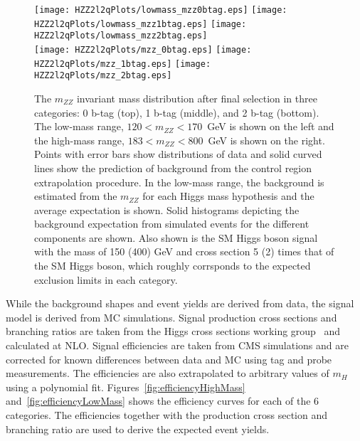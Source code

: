 \begin{figure}
\begin{center}
\texttt{[image: HZZ2l2qPlots/lowmass\_mzz0btag.eps]}
\texttt{[image: HZZ2l2qPlots/lowmass\_mzz1btag.eps]}
\texttt{[image: HZZ2l2qPlots/lowmass\_mzz2btag.eps]}\\
\texttt{[image: HZZ2l2qPlots/mzz\_0btag.eps]}
\texttt{[image: HZZ2l2qPlots/mzz\_1btag.eps]}
\texttt{[image: HZZ2l2qPlots/mzz\_2btag.eps]}
\caption{The $m_{ZZ}$ invariant mass distribution after final selection in
three categories: 0 b-tag (top), 1 b-tag (middle), and 2 b-tag (bottom). 
The low-mass range, $120<m_{ZZ}<170$~GeV is shown on the left and the
high-mass range, $183<m_{ZZ}<800$~GeV is shown on the right.  Points with
error bars show distributions of data and solid curved lines show the 
prediction of background from the control region extrapolation procedure.
In the low-mass range, the background is estimated from the $m_{ZZ}$ for
each Higgs mass hypothesis and the average expectation is shown.  Solid
histograms depicting the background expectation from simulated events
for the different components are shown.  Also shown is the SM Higgs boson
signal with the mass of 150 (400) GeV and cross section 5 (2) times that 
of the SM Higgs boson, which roughly corrsponds to the expected exclusion 
limits in each category.}
\label{fig:HZZ2l2qMassDistributions}
\end{center}
\end{figure}

While the background shapes and event yields are derived from data, the signal
model is derived from MC simulations.  Signal production cross sections
and branching ratios are taken from the Higgs cross sections working
group~\cite{??} and calculated at NLO.  Signal efficiencies are 
taken from CMS simulations and are
corrected for known differences between data and MC using tag and
probe measurements.  The efficiencies are also extrapolated to 
arbitrary values of $m_H$ using a polynomial fit.  Figures~\ref{fig:efficiencyHighMass}
and~\ref{fig:efficiencyLowMass}
shows the efficiency curves for each of the 6 categories.  The 
efficiencies together with the production cross section and branching
ratio are used to derive the expected event yields.

